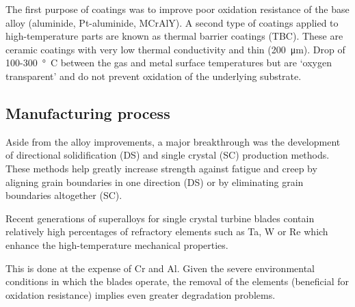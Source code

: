 The first purpose of coatings was to improve poor oxidation resistance of the base alloy (aluminide, Pt-aluminide, MCrAlY). A second type of coatings applied to high-temperature parts are known as thermal barrier coatings (TBC). These are ceramic coatings with very low thermal conductivity and thin (\SI{200}{\micro\meter}). Drop of 100-\SI{300}{\degree C} between the gas and metal surface temperatures but are `oxygen transparent' and do not prevent oxidation of the underlying substrate.
\subsection{Manufacturing process}
Aside from the alloy improvements, a major breakthrough was the development of directional solidification (DS) and single crystal (SC) production methods. These methods help greatly increase strength against fatigue and creep by aligning grain boundaries in one direction (DS) or by eliminating grain boundaries altogether (SC).

Recent generations of superalloys for single crystal turbine blades contain relatively high percentages of refractory elements such as Ta, W or Re which enhance the high-temperature mechanical properties.

This is done at the expense of Cr and Al. Given the severe environmental conditions in which the blades operate, the removal of the elements (beneficial for oxidation resistance) implies even greater degradation problems.

